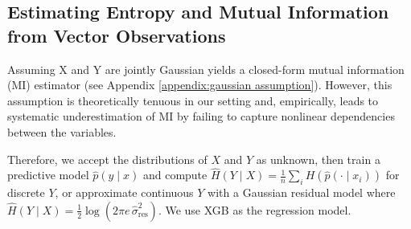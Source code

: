 \documentclass{article}
\theoremstyle{plain}
\theoremstyle{definition}
\theoremstyle{remark}
\begin{document}



\subsection{Estimating Entropy and Mutual Information from Vector Observations}
\label{sec:est MI under vec}

Assuming X and Y are jointly Gaussian yields a closed-form mutual information (MI) estimator (see Appendix \ref{appendix:gaussian assumption}). However, this assumption is theoretically tenuous in our setting and, empirically, leads to systematic underestimation of MI by failing to capture nonlinear dependencies between the variables.

Therefore, we accept the distributions of $X$ and $Y$ as unknown, then train a predictive model $\hat{p}(y\mid x)$ and compute $\widehat{H}(Y\mid X)=\tfrac{1}{n}\sum_i H(\hat{p}(\cdot\mid x_i))$ for discrete $Y$, or approximate continuous $Y$ with a Gaussian residual model where $\widehat{H}(Y\mid X)=\tfrac{1}{2}\log(2\pi e\,\widehat{\sigma}^2_{\mathrm{res}})$. We use XGB as the regression model.


\end{document}
